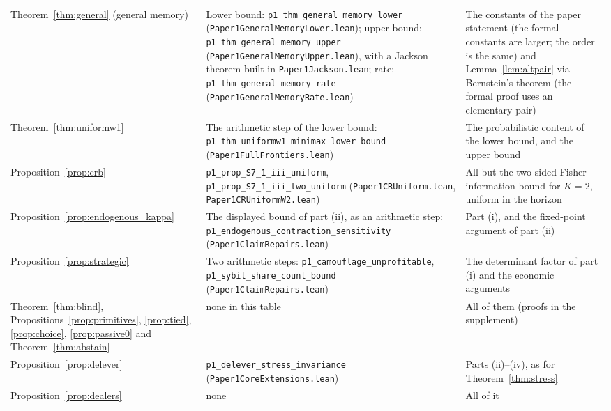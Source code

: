 \begin{longtable}{>{\raggedright\arraybackslash}p{}>{\raggedright\arraybackslash}p{}>{\raggedright\arraybackslash}p{}}
Theorem~\ref{thm:general} (general memory) & Lower bound: \texttt{p1\_thm\_general\_memory\_lower} (\nolinkurl{Paper1GeneralMemoryLower.lean}); upper bound: \texttt{p1\_thm\_general\_memory\_upper} (\nolinkurl{Paper1GeneralMemoryUpper.lean}), with a Jackson theorem built in \nolinkurl{Paper1Jackson.lean}; rate: \texttt{p1\_thm\_general\_memory\_rate} (\nolinkurl{Paper1GeneralMemoryRate.lean}) & The constants of the paper statement (the formal constants are larger; the order is the same) and Lemma~\ref{lem:altpair} via Bernstein's theorem (the formal proof uses an elementary pair)\\
Theorem~\ref{thm:uniformw1} & The arithmetic step of the lower bound: \texttt{p1\_thm\_uniformw1\_minimax\_lower\_bound} (\nolinkurl{Paper1FullFrontiers.lean}) & The probabilistic content of the lower bound, and the upper bound\\
Proposition~\ref{prop:crb} & \nolinkurl{p1_prop_S7_1_iii_uniform}, \nolinkurl{p1_prop_S7_1_iii_two_uniform} (\nolinkurl{Paper1CRUniform.lean}, \nolinkurl{Paper1CRUniformW2.lean}) & All but the two-sided Fisher-information bound for $K=2$, uniform in the horizon\\
Proposition~\ref{prop:endogenous_kappa} & The displayed bound of part (ii), as an arithmetic step: \nolinkurl{p1_endogenous_contraction_sensitivity} (\nolinkurl{Paper1ClaimRepairs.lean}) & Part (i), and the fixed-point argument of part (ii)\\
Proposition~\ref{prop:strategic} & Two arithmetic steps: \nolinkurl{p1_camouflage_unprofitable}, \nolinkurl{p1_sybil_share_count_bound} (\nolinkurl{Paper1ClaimRepairs.lean}) & The determinant factor of part (i) and the economic arguments\\
Theorem~\ref{thm:blind}, Propositions~\ref{prop:primitives}, \ref{prop:tied}, \ref{prop:choice}, \ref{prop:passive0} and Theorem~\ref{thm:abstain} & none in this table & All of them (proofs in the supplement)\\
Proposition~\ref{prop:delever} & \texttt{p1\_delever\_stress\_invariance} (\nolinkurl{Paper1CoreExtensions.lean}) & Parts (ii)--(iv), as for Theorem~\ref{thm:stress}\\
Proposition~\ref{prop:dealers} & none & All of it\\
\bottomrule
\end{longtable}

